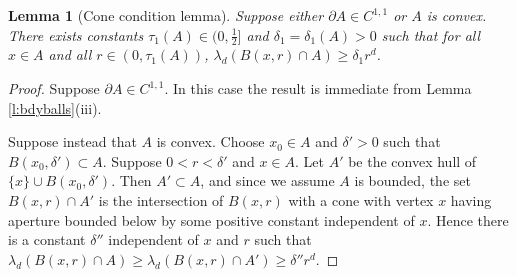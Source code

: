 \documentclass[12pt]{article}
\newtheorem{lemm}{Lemma}
\begin{document}
\begin{lemm}[Cone condition lemma]
	\label{l:conecond}
	Suppose either $\partial A \in C^{1,1}$ or $A$ is convex.
	There exists  constants $\tau_1(A) \in (0,\frac12]$
	and $\delta_1 = \delta_1(A) >0$
	such that for all $x \in A$ and all $r \in (0,\tau_1(A))$,
	$\lambda_d(B(x,r) \cap A) \geq \delta_1 r^d$.
\end{lemm}
\begin{proof}
	Suppose $\partial A \in C^{1,1}$. In this case
	the result is immediate from Lemma \ref{l:bdyballs}(iii).

	Suppose instead that $A$ is convex. Choose $x_0 \in A$ and $\delta' >0$
	such that $B(x_0,\delta') \subset A$.
	Suppose
	$0 < r < \delta'$
	and $x \in A$. Let $A'$ be the convex hull of $\{x\} \cup 
	B(x_0,\delta')$. Then $A' \subset A$, and since we assume $A$ 
	is bounded, the set $B(x,r) \cap A'$ is the intersection of
	$B(x,r)$ with a cone with vertex $x$ having 
	aperture bounded below by some positive constant
	independent of $x$. Hence there is a constant $\delta''$
	independent of $x$  and $r$ such that $\lambda_d(B(x,r) \cap A)
	\geq \lambda_d(B(x,r) \cap A') \geq \delta'' r^d$. 
\end{proof}
\end{document}
